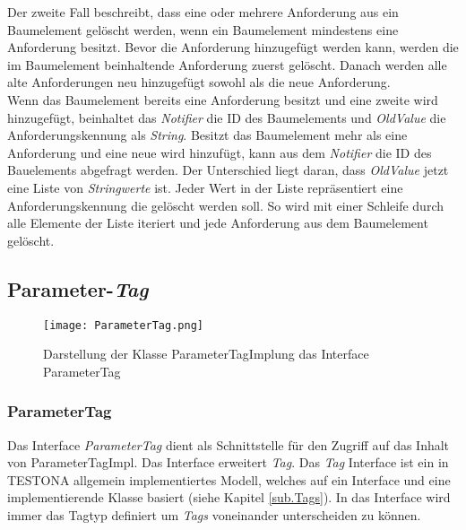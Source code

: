 Der zweite Fall beschreibt, dass eine oder mehrere Anforderung aus ein Baumelement gelöscht werden, wenn ein Baumelement mindestens eine Anforderung besitzt. Bevor die Anforderung hinzugefügt werden kann, werden die im Baumelement beinhaltende Anforderung zuerst gelöscht. Danach werden alle alte Anforderungen neu hinzugefügt sowohl als die neue Anforderung.\\


Wenn das Baumelement bereits eine Anforderung besitzt und eine zweite wird hinzugefügt, beinhaltet das \textit{Notifier} die ID des Baumelements und \textit{OldValue} die Anforderungskennung als \textit{String}. Besitzt das Baumelement mehr als eine Anforderung und eine neue wird hinzufügt, kann aus dem \textit{Notifier} die ID des Bauelements abgefragt werden. Der Unterschied liegt daran, dass \textit{OldValue} jetzt eine Liste von \textit{Stringwerte} ist. Jeder Wert in der Liste repräsentiert eine Anforderungskennung die gelöscht werden soll. So wird mit einer Schleife durch alle Elemente der Liste iteriert und jede Anforderung aus dem Baumelement gelöscht.\\



\subsection{Parameter-\textit{Tag}}\label{sub.ParameterTag}


\begin{figure}[h!]
  \begin{center}
    \texttt{[image: ParameterTag.png]}
  		  \caption{Darstellung der Klasse ParameterTagImplung das Interface ParameterTag}
     \label{uml.ParameterTag}
  \end{center}
\end{figure}






\subsubsection{ParameterTag}
Das Interface \textit{ParameterTag} dient als Schnittstelle für den Zugriff auf das Inhalt von ParameterTagImpl. Das Interface erweitert \textit{Tag}. Das \textit{Tag} Interface ist ein in TESTONA allgemein implementiertes Modell, welches auf ein Interface und eine implementierende Klasse basiert (siehe Kapitel \ref{sub.Tags}). In das Interface wird immer das Tagtyp definiert um \textit{Tags} voneinander unterscheiden zu können.

